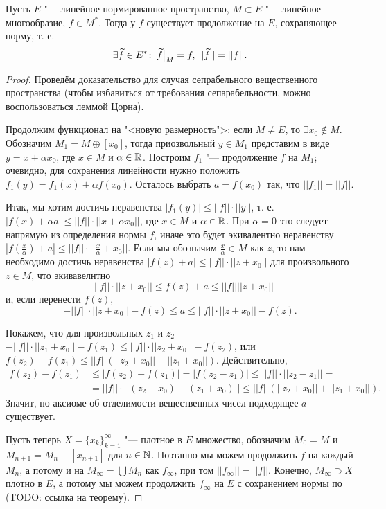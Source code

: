 \documentclass[main]{subfiles}
\begin{document}
\begin{theorem}
  Пусть \( E \) "--- линейное нормированное пространство,
  \( M \subset E \) "--- линейное многообразие,
  \( f \in M^* \).
  Тогда у \( f \) существует продолжение на \( E \), сохраняющее норму,
  т. е.
  \[
    \exists \widetilde{f} \in E^* \colon \:
    \widetilde{f} \bigr|_M = f, \:
    ||\widetilde{f}|| = ||f||.
  \]
\end{theorem}
\begin{proof}
  Проведём доказательство для случая
  сепрабельного вещественного пространства
  (чтобы избавиться от требования сепарабельности,
  можно воспользоваться леммой Цорна).

  Продолжим функционал на "<новую размерность">: если
  $M \ne E$, то $\exists x_0 \notin M$.
  Обозначим $M_1 = M \oplus [ x_0 ]$, тогда приозвольный \( y \in M_1 \)
  представим в виде $y = x + \alpha x_0$,
  где \( x \in M \) и \( \alpha \in \mathbb{R} \).
  Построим \( f_1 \) "--- продолжение \( f \) на \( M_1 \);
  очевидно, для сохранения линейности нужно положить
  $f_1(y) = f_1(x) + \alpha f(x_0)$.
  Осталось выбрать $a = f(x_0)$ так, что $||f_1|| = ||f||$.
  
  Итак, мы хотим достичь неравенства $|f_1(y)| \le ||f|| \cdot ||y||$,
  т. е. $|f(x) + \alpha a| \le ||f|| \cdot ||x + \alpha x_0||$,
  где $x \in M$ и $\alpha \in \mathbb{R}$.
  При \( \alpha = 0 \) это следует напрямую из определения нормы \( f \),
  иначе это будет экивалентно неравенству
  $|f(\frac{x}{\alpha}) + a| \le ||f|| \cdot ||\frac{x}{\alpha} + x_0||$.
  Если мы обозначим $\frac{x}\alpha \in M$ как \( z \),
  то нам необходимо достичь неравенства $|f(z) + a| \le ||f|| \cdot ||z + x_0||$
  для произвольного $z \in M$, что экивавелнтно
  \[ -||f|| \cdot ||z + x_0|| \le f(z) + a \le ||f|| ||z + x_0|| \]
  и, если перенести \( f(z) \),
  \[ -||f|| \cdot ||z + x_0|| - f(z) \le a \le ||f|| \cdot ||z + x_0|| - f(z). \]
  
  Покажем, что для произвольных $z_1$ и $z_2$
  $-||f|| \cdot ||z_1 + x_0|| - f(z_1) \le ||f|| \cdot ||z_2 + x_0|| - f(z_2)$,
  или $f(z_2) - f(z_1) \le ||f|| (||z_2 + x_0|| + ||z_1 + x_0||)$.
  Действительно,
  \begin{align}
    f(z_2) - f(z_1) &\le |f(z_2) - f(z_1)| = |f(z_2 - z_1)| \le ||f|| \cdot ||z_2 - z_1|| = \\
		    &= ||f|| \cdot ||(z_2 + x_0) - (z_1 + x_0)|| \le ||f|| (||z_2 + x_0|| + ||z_1 + x_0||).
  \end{align}
  Значит, по аксиоме об отделимости вещественных чисел подходящее \( a \) существует.

  Пусть теперь $X = \{ x_k \}_{k = 1}^\infty$ "--- плотное в $E$ множество,
  обозначим $M_0 = M$ и $M_{n + 1} = M_n + [x_{n+1}]$ для $n \in \mathbb{N}$.
  Поэтапно мы можем продолжить $f$ на каждый $M_n$, а потому и на
  $M_\infty = \bigcup M_n$ как $f_\infty$, при том $||f_\infty|| = ||f||$.
  Конечно, $M_\infty \supset X$ плотно в $E$, а потому мы можем продолжить
  $f_\infty$ на $E$ с сохранением нормы по (TODO: ссылка на теорему).
\end{proof}
\end{document}
